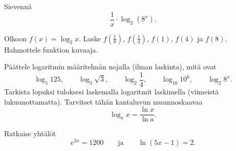 \begin{tehtava}
Sievennä\[\frac{1}{x} \cdot \log_2 (8^x).\]
\end{tehtava}

\begin{tehtava}
Olkoon $f(x) = \log_2 x$. Laske $f(\frac{1}{8})$, $f(\frac{1}{4})$, $f(1)$, $f(4)$ ja $f(8)$. Hahmottele funktion kuvaaja.
\end{tehtava}

\begin{tehtava}
Päättele logaritmin määritelmän nojalla (ilman laskinta), mitä ovat\[\log_5 125, \qquad \log_3\sqrt{3}, \qquad \log_2\frac{1}{4}, \qquad \log_{10}10^6, \qquad \log_2 8^x.\]Tarkista lopuksi tuloksesi laskemalla logaritmit laskimella (viimeistä lukuunottamatta). Tarvitset tähän kantaluvun muunnoskaavaa\[\log_a x=\frac{\ln x}{\ln a}.\]
\end{tehtava}

\begin{tehtava}
Ratkaise yhtälöt\[e^{2x}=1200 \qquad \text{ja} \qquad \ln(5x-1)=2.\]
\end{tehtava}
